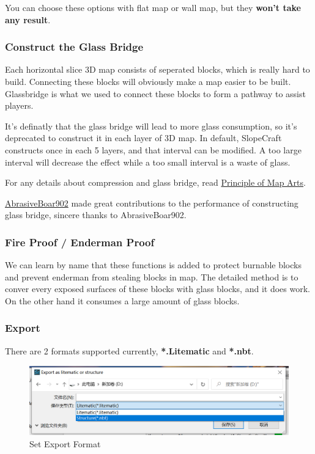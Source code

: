 \documentclass{article}
\begin{document}
    You can choose these options with flat map or wall map, but they \textbf{won't take any result}.

    \subsubsection{Construct the Glass Bridge}
    Each horizontal slice 3D map consists of seperated blocks, which is really hard to build. Connecting these blocks will obviously make a map easier to be built. Glassbridge is what we used to connect these blocks to form a pathway to assist players.
    
    It's definatly that the glass bridge will lead to more glass consumption, so it's deprecated to construct it in each layer of 3D map. In default, SlopeCraft constructs once in each 5 layers, and that interval can be modified. A too large interval will decrease the effect while a too small interval is a waste of glass.
    
    For any details about compression and glass bridge, read \href{https://github.com/ToKiNoBug/SlopeCraftTutorial/blob/main/BasicPrinciple/Principle%20of%20map%20pixel%20arts.md}{Principle of Map Arts}.

    \href{https://github.com/AbrasiveBoar902}{AbrasiveBoar902} made great contributions to the performance of constructing glass bridge, sincere thanks to AbrasiveBoar902.

    \subsubsection{Fire Proof / Enderman Proof}
    We can learn by name that these functions is added to protect burnable blocks and prevent enderman from stealing blocks in map. The detailed method is to conver every exposed surfaces of these blocks with glass blocks, and it does work. On the other hand it consumes a large amount of glass blocks.

    \subsubsection{Export}
    There are 2 formats supported currently, \textbf{*.Litematic} and \textbf{*.nbt}.

    \begin{figure}[htbp]
        \centering
        \includegraphics[width=15cm]{Img7_SelectFormat.png}
        \caption{Set Export Format}
        \label{setExport3DFormat}
    \end{figure}
\end{document}
